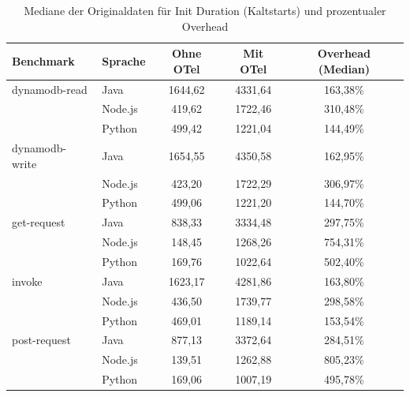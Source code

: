 \begin{table}[H]
\centering
\footnotesize
\caption{Mediane der Originaldaten für Init Duration (Kaltstarts) und prozentualer Overhead}
\label{app:raw-init-cold}
\begin{tabular}{|l|l|c|c|c|}
\hline
\textbf{Benchmark} & \textbf{Sprache} & \textbf{Ohne OTel} & \textbf{Mit OTel} & \textbf{Overhead (Median)} \\
\hline
dynamodb-read   & Java    & 1644,62 & 4331,64 & 163,38\% \\
                & Node.js &  419,62 & 1722,46 & 310,48\% \\
                & Python  &  499,42 & 1221,04 & 144,49\% \\
\hline
dynamodb-write  & Java    & 1654,55 & 4350,58 & 162,95\% \\
                & Node.js &  423,20 & 1722,29 & 306,97\% \\
                & Python  &  499,06 & 1221,20 & 144,70\% \\
\hline
get-request     & Java    &  838,33 & 3334,48 & 297,75\% \\
                & Node.js &  148,45 & 1268,26 & 754,31\% \\
                & Python  &  169,76 & 1022,64 & 502,40\% \\
\hline
invoke          & Java    & 1623,17 & 4281,86 & 163,80\% \\
                & Node.js &  436,50 & 1739,77 & 298,58\% \\
                & Python  &  469,01 & 1189,14 & 153,54\% \\
\hline
post-request    & Java    &  877,13 & 3372,64 & 284,51\% \\
                & Node.js &  139,51 & 1262,88 & 805,23\% \\
                & Python  &  169,06 & 1007,19 & 495,78\% \\
\hline
\end{tabular}
\end{table}


